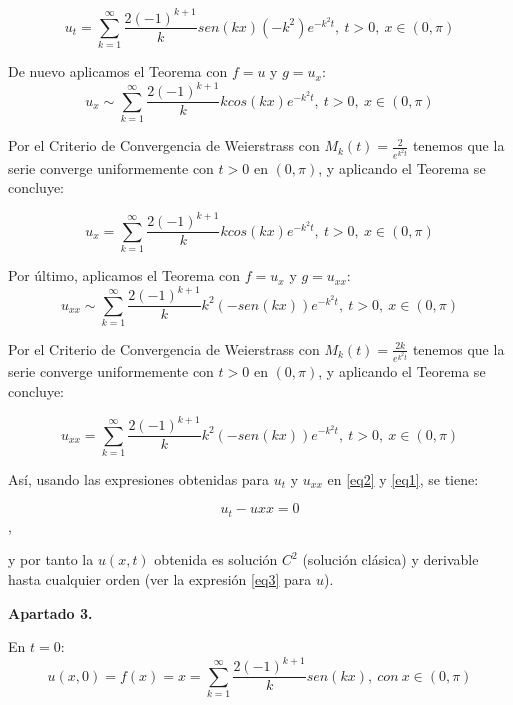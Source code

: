 \documentclass[bibnumbers, palatino]{apuntes}
\begin{document}
\begin{equation}
u_t  = \sum^{\infty}_{k=1} \frac{2(-1)^{k+1}}{k} sen(kx)(-k^2)e^{-k^2t}, ~ t>0, ~ x\in(0,\pi)
\label{eq2}
\end{equation}

De nuevo aplicamos el Teorema con $f = u$ y $g = u_x$:
$$u_x  \sim \sum^{\infty}_{k=1} \frac{2(-1)^{k+1}}{k} k cos(kx)e^{-k^2t}, ~ t>0, ~ x\in(0,\pi)$$

Por el Criterio de Convergencia de Weierstrass  con $M_k(t) = \frac{2}{e^{k^2t}}$ tenemos que la serie converge uniformemente con $t>0$ en $(0,\pi)$, y aplicando el Teorema se concluye:

$$u_x  = \sum^{\infty}_{k=1} \frac{2(-1)^{k+1}}{k} k cos(kx)e^{-k^2t}, ~ t>0, ~ x\in(0,\pi)$$


Por último, aplicamos el Teorema con $f = u_x$ y $g = u_{xx}$:
$$u_{xx}  \sim \sum^{\infty}_{k=1} \frac{2(-1)^{k+1}}{k} k^2 (-sen(kx))e^{-k^2t}, ~ t>0, ~ x\in(0,\pi)$$

Por el Criterio de Convergencia de Weierstrass  con $M_k(t) = \frac{2k}{e^{k^2t}}$ tenemos que la serie converge uniformemente con $t>0$ en $(0,\pi)$, y aplicando el Teorema se concluye:

\begin{equation}
u_{xx}  = \sum^{\infty}_{k=1} \frac{2(-1)^{k+1}}{k} k^2 (-sen(kx))e^{-k^2t}, ~ t>0, ~ x\in(0,\pi)
\label{eq1}
\end{equation}

Así, usando las expresiones obtenidas para $u_t$ y $u_{xx}$ en \ref{eq2} y \ref{eq1}, se tiene:

$$u_t - u{xx} = 0$$,

y por tanto la $u(x,t)$ obtenida es solución $C^2$ (solución clásica) y derivable hasta cualquier orden (ver la expresión \ref{eq3} para $u$).

\textbf{Apartado 3.}\newline

En $t=0$:
\[u(x,0) = f(x) =  x = \sum^{\infty}_{k=1} \frac{2(-1)^{k+1}}{k} sen(kx),~con~x\in(0,\pi) \]
\end{document}
